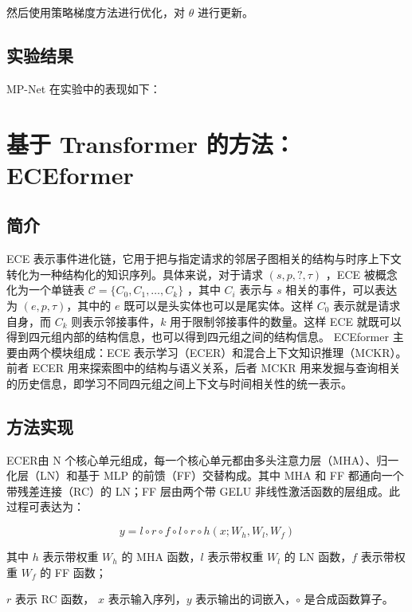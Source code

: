 \documentclass[a4paper, AutoFakeBold]{article}
\begin{document}
然后使用策略梯度方法进行优化，对 $\theta$ 进行更新。

\subsection{实验结果}

MP-Net 在实验中的表现如下：










\section{基于 Transformer 的方法：ECEformer}

\subsection{简介}

ECE 表示事件进化链，它用于把与指定请求的邻居子图相关的结构与时序上下文转化为一种结构化的知识序列。具体来说，对于请求 $(s,p,?,\tau)$ ，ECE 被概念化为一个单链表 ${\mathcal C}=\{C_0,C_1,\dots,C_k\}$ ，其中 $C_i$ 表示与 $s$ 相关的事件，可以表达为 $(e,p,\tau)$，其中的 $e$ 既可以是头实体也可以是尾实体。这样 $C_0$ 表示就是请求自身，而 $C_k$ 则表示邻接事件，$k$ 用于限制邻接事件的数量。这样 ECE 就既可以得到四元组内部的结构信息，也可以得到四元组之间的结构信息。
ECEformer 主要由两个模块组成：ECE 表示学习（ECER）和混合上下文知识推理（MCKR）。前者 ECER 用来探索图中的结构与语义关系，后者 MCKR 用来发掘与查询相关的历史信息，即学习不同四元组之间上下文与时间相关性的统一表示。


\subsection{方法实现}

ECER由 N 个核心单元组成，每一个核心单元都由多头注意力层（MHA）、归一化层（LN）和基于 MLP 的前馈（FF）交替构成。其中 MHA 和 FF 都通向一个带残差连接（RC）的 LN；FF 层由两个带 GELU 非线性激活函数的层组成。此过程可表达为：

\begin{equation}
y=l\circ r\circ f\circ l\circ r \circ h(x;W_h,W_l,W_f)
\end{equation}

其中 $h$ 表示带权重 $W_h$ 的 MHA 函数，$l$ 表示带权重 $W_l$ 的 LN 函数，$f$ 表示带权重 $W_f$ 的 FF 函数；

$r$ 表示 RC 函数， $x$ 表示输入序列，$y$ 表示输出的词嵌入，$\circ$ 是合成函数算子。
\end{document}
